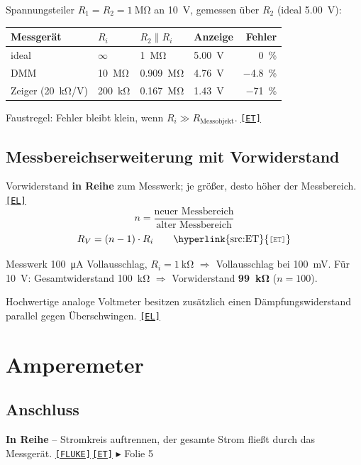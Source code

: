 \documentclass[11pt,a4paper]{article}
\newcommand{\q}[1]{\hyperlink{src:#1}{\textcolor{quelle}{\texttt{\footnotesize[#1]}}}}
\newcommand{\folie}[1]{\textcolor{akzent}{\footnotesize\textsf{$\blacktriangleright$ Folie #1}}}
\begin{document}
\begin{beispiel}[(nachgerechnet)]
Spannungsteiler $R_1=R_2=\SI{1}{\mega\ohm}$ an \SI{10}{\volt}, gemessen über $R_2$ (ideal \SI{5.00}{\volt}):\\[1mm]
\begin{tabular}{@{}llllr@{}}
\toprule
Messgerät & $R_i$ & $R_2\parallel R_i$ & Anzeige & Fehler\\ \midrule
ideal & $\infty$ & \SI{1}{\mega\ohm} & \SI{5.00}{\volt} & \SI{0}{\percent}\\
DMM & \SI{10}{\mega\ohm} & \SI{0.909}{\mega\ohm} & \SI{4.76}{\volt} & \SI{-4.8}{\percent}\\
Zeiger (\SI{20}{\kilo\ohm/\volt}) & \SI{200}{\kilo\ohm} & \SI{0.167}{\mega\ohm} & \SI{1.43}{\volt} & \SI{-71}{\percent}\\
\bottomrule
\end{tabular}
\end{beispiel}
Faustregel: Fehler bleibt klein, wenn $R_i\gg R_\text{Messobjekt}$. \q{ET}

\subsection{Messbereichserweiterung mit Vorwiderstand}\label{sec:vorwiderstand}
Vorwiderstand \textbf{in Reihe} zum Messwerk; je größer, desto höher der Messbereich. \q{EL}
\begin{equation}\label{f:n}
n=\frac{\text{neuer Messbereich}}{\text{alter Messbereich}}
\end{equation}
\begin{equation}\label{f:rv}
R_V=(n-1)\cdot R_i \qquad\text{\q{ET}}
\end{equation}
\begin{beispiel}[\q{EL}]
Messwerk \SI{100}{\micro\ampere} Vollausschlag, $R_i=\SI{1}{\kilo\ohm}$ $\Rightarrow$ Vollausschlag bei \SI{100}{\milli\volt}.
Für \SI{10}{\volt}: Gesamtwiderstand \SI{100}{\kilo\ohm} $\Rightarrow$ Vorwiderstand \textbf{\SI{99}{\kilo\ohm}} ($n=100$).
\end{beispiel}
Hochwertige analoge Voltmeter besitzen zusätzlich einen Dämpfungswiderstand parallel gegen Überschwingen. \q{EL}

\section{Amperemeter}\label{sec:amp}

\subsection{Anschluss}
\textbf{In Reihe} -- Stromkreis auftrennen, der gesamte Strom fließt durch das Messgerät. \q{FLUKE}\,\q{ET} \folie{5}
\end{document}
